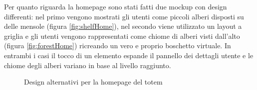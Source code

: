Per quanto riguarda la homepage sono stati fatti due mockup con design differenti: nel primo vengono mostrati gli utenti come piccoli alberi disposti su delle mensole (figura \ref{fig:shelfHome}), nel secondo viene utilizzato un layout a griglia e gli utenti vengono rappresentati come chiome di alberi visti dall'alto (figura \ref{fig:forestHome}) ricreando un vero e proprio boschetto virtuale. In entrambi i casi il tocco di un elemento espande il pannello dei dettagli utente e le chiome degli alberi variano in base al livello raggiunto.
\begin{figure}
    \centering
    \caption[Alternative di homepage nel totem]{Design alternativi per la homepage del totem}
    \label{fig:homepages}
\end{figure}

